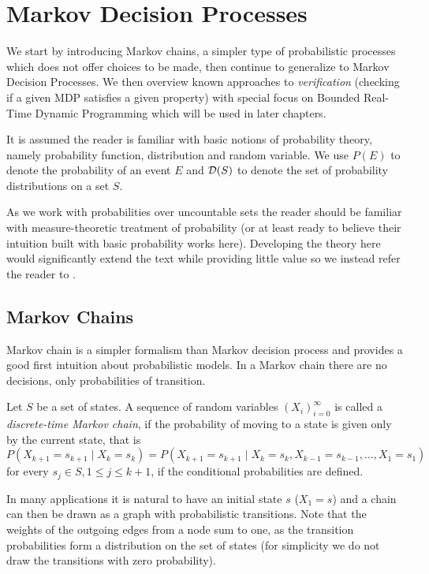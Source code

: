 \chapter{Markov Decision Processes}
\label{ch_mdp}

We start by introducing Markov chains, a simpler type of
probabilistic processes which does not offer choices to be made,
then continue to generalize to Markov Decision Processes.
We then overview known approaches to {\em verification} (checking if a
given MDP satisfies a given property) with special focus on Bounded
Real-Time Dynamic Programming which will be used in later chapters.

It is assumed the reader is familiar with basic notions of probability
theory, namely probability function, distribution and random variable.
We use $P(E)$ to denote the probability of an event $E$ and
$\mathcal{D}(S)$ to denote the set of probability distributions on a set $S$.

As we work with probabilities over uncountable sets the reader should be
familiar with measure-theoretic treatment of probability (or at least
ready to believe their intuition built with basic probability works here).
Developing the theory here would significantly extend the text while
providing little value so we instead refer the reader to
\parencite{probability}.

\section{Markov Chains}

Markov chain is a simpler formalism than
Markov decision process and provides a good first intuition about
probabilistic models. In a Markov chain there are no decisions, only
probabilities of transition.

\begin{definition}
    Let $S$ be a set of states.
    A sequence of random variables $(X_i)^{\infty}_{i=0}$
    is called a {\em discrete-time Markov chain},
    if the probability of moving to a state is given only by the
    current state, that is
    $P(X_{k+1} = s_{k+1} \mid X_k = s_k) =
    P(X_{k+1} = s_{k+1} \mid X_k = s_k, X_{k-1} = s_{k-1},
    \ldots, X_{1} = s_{1})$ for every $s_j \in S, 1 \leq j \leq k + 1$,
    if the conditional probabilities are defined.
\end{definition}

In many applications it is natural to have an initial state
$s$ ($X_1 = s$) and a chain can
then be drawn as a graph with probabilistic transitions. Note
that the weights of the outgoing edges from a node sum to one, as the
transition probabilities form a distribution on the set of states (for
simplicity we do not draw the transitions with zero probability).

